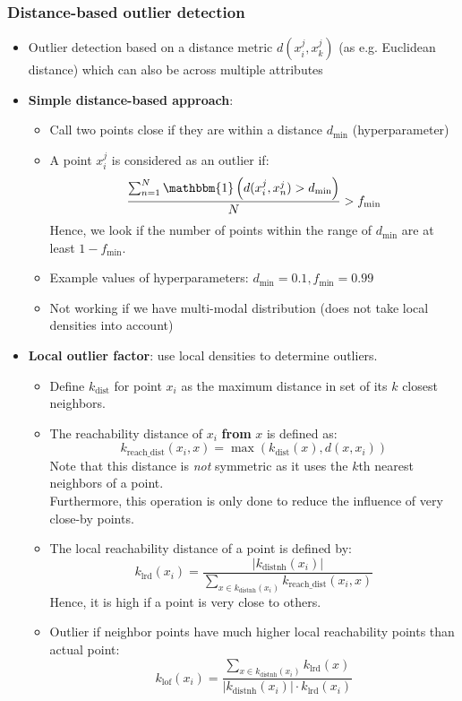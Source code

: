 \subsubsection{Distance-based outlier detection}
\begin{itemize}
	\item Outlier detection based on a distance metric $d(x_{i}^{j}, x_{k}^{j})$ (as e.g. Euclidean distance) which can also be across multiple attributes
	\item \textbf{Simple distance-based approach}:
	\begin{itemize}
		\item Call two points close if they are within a distance $d_{\text{min}}$ (hyperparameter)
		\item A point $x_{i}^{j}$ is considered as an outlier if:
		$$\frac{\sum_{n=1}^{N} \mathbbm{1}\left(d(x_{i}^{j}, x_{n}^{j}) > d_{\text{min}}\right)}{N} > f_{\text{min}}$$
		Hence, we look if the number of points within the range of $d_{\text{min}}$ are at least $1-f_{\text{min}}$.
		\item Example values of hyperparameters: $d_{\text{min}}=0.1, f_{\text{min}}=0.99$
		\item Not working if we have multi-modal distribution (does not take local densities into account)
	\end{itemize}
	\item \textbf{Local outlier factor}: use local densities to determine outliers.
	\begin{itemize}
		\item Define $k_{\text{dist}}$ for point $x_{i}$ as the maximum distance in set of its $k$ closest neighbors. 
		\item The reachability distance of $x_{i}$ \textbf{from} $x$ is defined as:
		$$k_{\text{reach\_dist}}(x_i, x) = \max\left(k_{\text{dist}}(x), d(x, x_i)\right)$$
		Note that this distance is \textit{not} symmetric as it uses the $k$th nearest neighbors of a point.\\
		Furthermore, this operation is only done to reduce the influence of very close-by points. 
		\item The local reachability distance of a point is defined by:
		$$k_{\text{lrd}}\left(x_{i}\right) = \frac{\left|k_{\text{distnh}}\left(x_{i}\right)\right| }{\sum\limits_{x\in k_{\text{distnh}}\left(x_{i}\right)} k_{\text{reach\_dist}}\left(x_i, x\right)}$$
		Hence, it is high if a point is very close to others.
		\item Outlier if neighbor points have much higher local reachability points than actual point:
		$$k_{\text{lof}}\left(x_{i}\right) = \frac{\sum\limits_{x\in k_{\text{distnh}}\left(x_{i}\right)} k_{\text{lrd}}\left(x\right)}{\left|k_{\text{distnh}}\left(x_{i}\right)\right| \cdot k_{\text{lrd}}\left(x_{i}\right)}$$
	\end{itemize}
\end{itemize}
